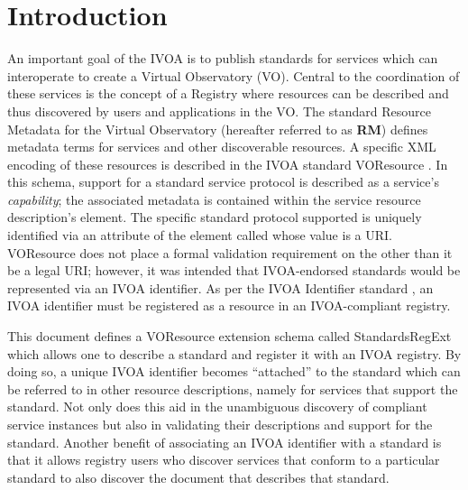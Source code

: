 \documentclass[11pt,a4paper]{ivoa}
\begin{document}
\section{Introduction}

\label{sect:intro}

An important goal of the IVOA is to publish standards for services
which can interoperate to create a Virtual Observatory (VO).  Central
to the coordination of these services is the concept of a Registry
where resources can be described and thus
discovered by users and applications in the VO.  The standard
Resource
Metadata for the Virtual Observatory \citep{2007ivoa.spec.0302H}
(hereafter referred to as \textbf{RM}) defines
metadata terms for services and other discoverable resources.  A
specific XML encoding of these resources is described in the IVOA standard
VOResource \citep{2018ivoa.spec.0625P}.
In this schema, support for a standard service protocol is described
as a service's \emph{capability}; the associated metadata is
contained within the service resource description's
 element.  The
specific standard protocol supported is uniquely identified via an
attribute of the  element called
whose value is a URI.  VOResource does
not place a formal validation requirement on the
 other than it be a legal URI; however, it
was intended that IVOA-endorsed standards would be represented via an
IVOA identifier.  As per the IVOA Identifier standard
\citep{2016ivoa.spec.0523D},
an IVOA identifier must be registered as a
resource in an IVOA-compliant registry.  



This document defines a VOResource extension schema called
StandardsRegExt which allows one to describe a standard
and register it with an IVOA registry.  By doing so, a unique IVOA
identifier becomes ``attached'' to the standard which can be referred to
in other resource descriptions, namely for services that support the
standard.  Not only does this aid in the unambiguous discovery of
compliant service instances but also in validating their descriptions
and support for the standard.  Another benefit of associating an IVOA
identifier with a standard is that it allows registry users who discover
services that conform to a particular standard to also discover the
document that describes that standard.
\end{document}
